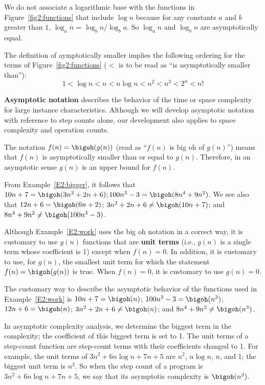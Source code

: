 We do not associate a logarithmic
base with the functions in Figure~\ref{fig2:functions}
that include $\log n$
because for any constants $a$ and $b$ greater than $1$,
$\log_a n$ = $\log_b n /  \log_b a$.
So $\log_a n$ and $\log_b n$
are asymptotically equal.

The definition of aymptotically smaller implies
the following ordering for
the terms of Figure~\ref{fig2:functions} ($<$ is to be read as
``is asymptotically smaller than''):
\[
1 < \log n < n < n \log n < n^2 < n^3 < 2^n < n!
\]

{\bf Asymptotic notation}
describes the behavior of the time or space complexity for large
instance characteristics.
Although we will develop asymptotic notation
with reference to step counts alone, our
development also applies to space complexity and operation
counts.

The notation $f(n) = \bigoh (g(n))$ (read as ``$f(n)$ is big oh of $g(n)$'')
means that $f(n)$ is asymptotically smaller than or equal to $g(n)$.
Therefore, in an asymptotic sense $g(n)$ is an upper bound
for $f(n)$.

\begin{example}\label{E2:work}
From Example~\ref{E2:bigger},
it follows that
$10n+7 =
\bigoh (3n^2+2n+6);
100n^3 - 3 =
\bigoh (8n^4 + 9n^2)$. We see also that
$12n + 6 = \bigoh (6n+2)$;
$3n^2+2n+6 \neq
\bigoh (10n+7)$;
and
$8n^4 + 9n^2 \neq
\bigoh (100n^3 - 3)$.  
\end{example}

Although Example~\ref{E2:work} uses the big oh notation in a correct
way, it is customary to use $g(n)$ functions that are {\bf unit terms} (i.e.,
$g(n)$ is a single term whose coefficient is 1) except when $f(n) = 0$.
In addition, it is customary to use, for $g(n)$, the smallest unit term
for which the statement $f(n) = \bigoh (g(n))$ is true.
When $f(n) = 0$, it is customary to use $g(n) = 0$.

\begin{example}
The customary way to describe the asymptotic behavior of the functions
used in Example~\ref{E2:work} is
$10n+7 = \bigoh (n)$; $100n^3 - 3 = \bigoh (n^3)$; $12n + 6 = \bigoh (n)$;
$3n^2+2n+6 \neq \bigoh (n)$; and $8n^4 + 9n^2 \neq \bigoh (n^3)$.
\end{example}

In asymptotic complexity analysis, we determine the biggest term
in the complexity; the coefficient of this biggest term is set to 1.
The unit terms of a step-count function are step-count terms with their
coefficients changed to 1.
For example, the unit terms of $3n^2 + 6n \log n +7n +5$
are $n^2$, $n \log n$, $n$, and 1; the biggest unit term is $n^2$.
So when the step count of a program is
$3n^2 + 6n \log n +7n +5$, we say that its asymptotic complexity
is $\bigoh (n^2)$.

